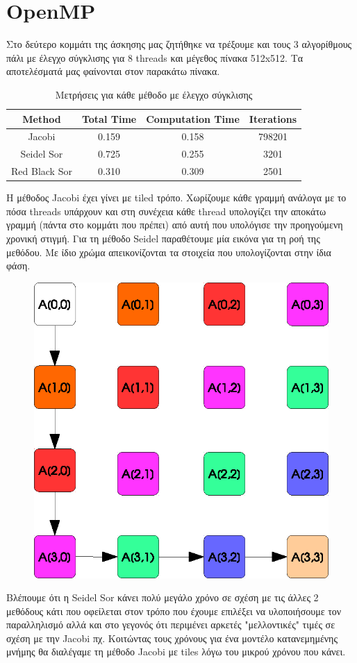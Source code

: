 \documentclass[11pt,a4paper]{article}
\begin{document}
\section*{OpenMP}
Στο δεύτερο κομμάτι της άσκησης μας ζητήθηκε να τρέξουμε και τους 3 αλγορίθμους πάλι με έλεγχο σύγκλισης για 8 threads και μέγεθος πίνακα 512x512. Τα αποτελέσματά
μας φαίνονται στον παρακάτω πίνακα.
\begin{table}[!h]
    \centering
    \begin{tabular}{|c|c|c|c|}
        \hline
        Method & Total Time & Computation Time & Iterations \\
        \hline
        \hline
        Jacobi & 0.159 & 0.158 & 798201 \\
        \hline 
        Seidel Sor & 0.725 & 0.255 & 3201 \\
        \hline
        Red Black Sor & 0.310 & 0.309 & 2501 \\
        \hline
    \end{tabular}
    \caption{Μετρήσεις για κάθε μέθοδο με έλεγχο σύγκλισης}
\end{table}
H μέθοδος Jacobi έχει γίνει με tiled τρόπο. Χωρίζουμε κάθε γραμμή ανάλογα με το πόσα threads υπάρχουν και στη συνέχεια κάθε thread υπολογίζει την αποκάτω γραμμή
(πάντα στο κομμάτι που πρέπει) από αυτή που υπολόγισε την προηγούμενη χρονική στιγμή. Για τη μέθοδο Seidel παραθέτουμε μία εικόνα για τη ροή της μεθόδου. Με ίδιο 
χρώμα απεικονίζονται τα στοιχεία που υπολογίζονται στην ίδια φάση.
\begin{figure}
    \centering
    \includegraphics[scale=0.7]{seidelFlow.eps}
\end{figure}
Βλέπουμε ότι η Seidel Sor κάνει πολύ μεγάλο χρόνο σε σχέση με τις άλλες 2 μεθόδους κάτι που οφείλεται στον τρόπο που έχουμε επιλέξει να υλοποιήσουμε τον 
παραλληλισμό αλλά και στο γεγονός ότι περιμένει αρκετές "μελλοντικές" τιμές σε σχέση με την Jacobi πχ. 
Κοιτώντας τους χρόνους για ένα μοντέλο κατανεμημένης μνήμης θα διαλέγαμε τη μέθοδο Jacobi με tiles λόγω του μικρού χρόνου που κάνει.
\end{document}
